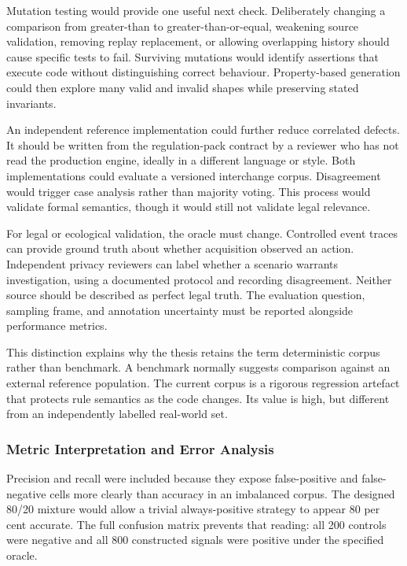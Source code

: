 Mutation testing would provide one useful next check. Deliberately changing a comparison from greater-than to greater-than-or-equal, weakening source validation, removing replay replacement, or allowing overlapping history should cause specific tests to fail. Surviving mutations would identify assertions that execute code without distinguishing correct behaviour. Property-based generation could then explore many valid and invalid shapes while preserving stated invariants.

An independent reference implementation could further reduce correlated defects. It should be written from the regulation-pack contract by a reviewer who has not read the production engine, ideally in a different language or style. Both implementations could evaluate a versioned interchange corpus. Disagreement would trigger case analysis rather than majority voting. This process would validate formal semantics, though it would still not validate legal relevance.

For legal or ecological validation, the oracle must change. Controlled event traces can provide ground truth about whether acquisition observed an action. Independent privacy reviewers can label whether a scenario warrants investigation, using a documented protocol and recording disagreement. Neither source should be described as perfect legal truth. The evaluation question, sampling frame, and annotation uncertainty must be reported alongside performance metrics.

This distinction explains why the thesis retains the term deterministic corpus rather than benchmark. A benchmark normally suggests comparison against an external reference population. The current corpus is a rigorous regression artefact that protects rule semantics as the code changes. Its value is high, but different from an independently labelled real-world set.

\subsubsection{Metric Interpretation and Error Analysis}

Precision and recall were included because they expose false-positive and false-negative cells more clearly than accuracy in an imbalanced corpus. The designed 80/20 mixture would allow a trivial always-positive strategy to appear 80 per cent accurate. The full confusion matrix prevents that reading: all 200 controls were negative and all 800 constructed signals were positive under the specified oracle.

